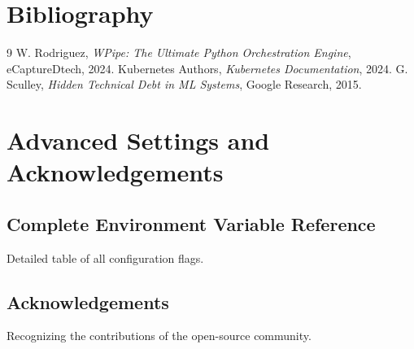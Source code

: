 \documentclass[12pt,a4paper]{report}
\begin{document}
\chapter{Bibliography}
\cleardoublepage
\begin{thebibliography}{9}
 W. Rodriguez, \textit{WPipe: The Ultimate Python Orchestration Engine}, eCaptureDtech, 2024.
 Kubernetes Authors, \textit{Kubernetes Documentation}, 2024.
 G. Sculley, \textit{Hidden Technical Debt in ML Systems}, Google Research, 2015.
\end{thebibliography}

\appendix
\chapter{Advanced Settings and Acknowledgements}
\cleardoublepage
\section{Complete Environment Variable Reference}
Detailed table of all configuration flags.

\cleardoublepage
\section{Acknowledgements}
Recognizing the contributions of the open-source community.
\end{document}
